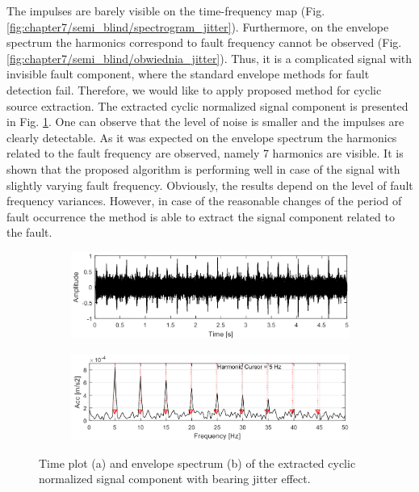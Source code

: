 The impulses are barely visible on the time-frequency map (Fig. \ref{fig:chapter7/semi_blind/spectrogram_jitter}). Furthermore, on the envelope spectrum the harmonics correspond to fault frequency cannot be observed (Fig. \ref{fig:chapter7/semi_blind/obwiednia_jitter}). Thus, it is a complicated signal with invisible fault component, where the standard envelope methods for fault detection fail. Therefore, we would like to apply proposed method for cyclic source extraction. The extracted cyclic normalized signal component is presented in Fig. \ref{fig:chapter7/semi_blind/time_jitter_filtr}. One can observe that the level of noise is smaller and the impulses are clearly detectable. As it was expected on the envelope spectrum the harmonics related to the fault frequency are observed, namely 7 harmonics are visible. It is shown that the proposed algorithm is performing well in case of the signal with slightly varying fault frequency. Obviously, the results depend on the level of fault frequency variances. However, in case of the reasonable changes of the period of fault occurrence the method is able to extract the signal component related to the fault.
%
\begin{figure}[!ht]
    \centering
    \begin{subfigure}[b]{0.8\textwidth}
        \centering
        \captionsetup{skip=0.01pt}
         \caption{}
        \includegraphics[width=\textwidth]{wykresy/chapter_application/semi_blind/sygnal_jitter_filtr.png}
        \label{fig:chapter7/semi_blind/time_jitter_filtr}
    \end{subfigure}

    \begin{subfigure}[b]{0.8\textwidth}
        \centering
        \captionsetup{skip=0.01pt}
        \caption{}
        \includegraphics[width=\textwidth]{wykresy/chapter_application/semi_blind/widmo_obwiedni_jitter_filtr.png}
        \label{fig:chapter7/semi_blind/obwiednia_jitter_filtr}
    \end{subfigure}
    \caption{Time plot (a) and envelope spectrum (b) of the extracted cyclic normalized signal component with bearing jitter effect.}
\end{figure}
%
